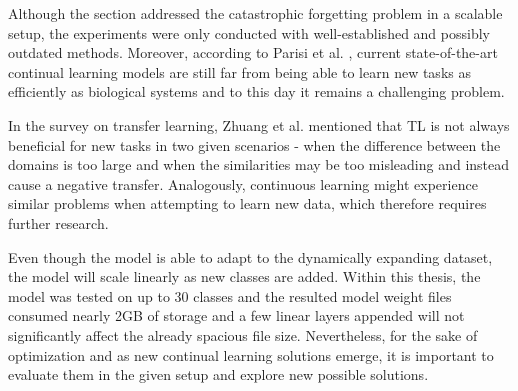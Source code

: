 Although the  section addressed the catastrophic forgetting problem in a scalable setup, the experiments were only conducted with well-established and possibly outdated methods. Moreover, according to Parisi et al. \cite{Parisi2018}, current state-of-the-art continual learning models are still far from being able to learn new tasks as efficiently as biological systems and to this day it remains a challenging problem. 

In the survey on transfer learning, Zhuang et al. \cite{Zhuang2019} mentioned that TL is not always beneficial for new tasks in two given scenarios - when the difference between the domains is too large and when the similarities may be too misleading and instead cause a negative transfer. Analogously, continuous learning might experience similar problems when attempting to learn new data, which therefore requires further research.  

Even though the model is able to adapt to the dynamically expanding dataset, the model will scale linearly as new classes are added. Within this thesis, the model was tested on up to 30 classes and the resulted model weight files consumed nearly 2GB of storage and a few linear layers appended will not significantly affect the already spacious file size. Nevertheless, for the sake of optimization and as new continual learning solutions emerge, it is important to evaluate them in the given setup and explore new possible solutions. 


\clearpage
